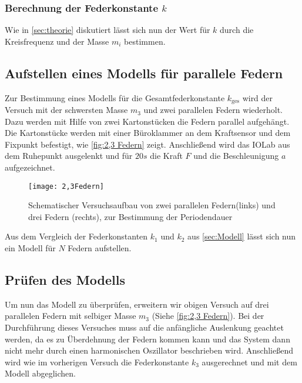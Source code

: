 \subsubsection{Berechnung der Federkonstante \( k \)}
Wie in \autoref{sec:theorie} diskutiert lässt sich nun der Wert für $k$ durch die Kreisfrequenz und der Masse $m_i$ bestimmen.
\subsection{Aufstellen eines Modells für parallele Federn}
\label{sec:Modell}
Zur Bestimmung eines Modells für die Gesamtfederkonstante $k_{\text{ges}}$ wird der Versuch mit der schwersten  Masse $m_3$ und zwei parallelen Federn wiederholt. Dazu werden mit Hilfe von zwei Kartonstücken die Federn parallel aufgehängt. Die Kartonstücke werden mit einer Büroklammer an dem Kraftsensor und dem Fixpunkt befestigt, wie \autoref{fig:2,3 Federn} zeigt. Anschließend wird das IOLab aus dem Ruhepunkt ausgelenkt und für $20s$ die Kraft $F$ und die Beschleunigung $a$ aufgezeichnet.
\begin{figure}[H]
	\centering
	\texttt{[image: 2,3Federn]}
	\caption[Versuchsaufbau mit mehreren Federn]{Schematischer Versuchsaufbau von zwei parallelen Federn(links) und drei Federn (rechts), zur Bestimmung der Periodendauer}
	\label{fig:2,3 Federn}
\end{figure}
Aus dem Vergleich der Federkonstanten $k_1$ und $k_2$ aus \autoref{sec:Modell} lässt sich nun ein Modell für $N$ Federn aufstellen.
\subsection{Prüfen des Modells}
Um nun das Modell zu überprüfen, erweitern wir obigen Versuch auf drei parallelen Federn mit selbiger Masse $m_3$ (Siehe \autoref{fig:2,3 Federn}). Bei der Durchführung dieses Versuches muss auf die anfängliche Auslenkung geachtet werden, da es zu Überdehnung der Federn kommen kann und das System dann nicht mehr durch einen harmonischen Oszillator beschrieben wird. Anschließend wird wie im vorherigen Versuch die Federkonstante \( k_3 \) ausgerechnet und mit dem Modell abgeglichen.